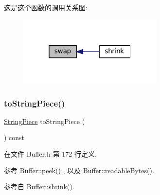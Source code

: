 这是这个函数的调用关系图\+:
\nopagebreak
\begin{figure}[H]
\begin{center}
\leavevmode
\includegraphics[width=205pt]{classmuduo_1_1net_1_1Buffer_a5a6560acf9880bf7a3b210c07bb3db2e_icgraph}
\end{center}
\end{figure}
\mbox{\label{classmuduo_1_1net_1_1Buffer_a78096dee3d0826efb63a5b814eef37c4}} 
\subsubsection{\texorpdfstring{to\+String\+Piece()}{toStringPiece()}}
{\footnotesize\ttfamily \hyperlink{classmuduo_1_1StringPiece}{String\+Piece} to\+String\+Piece (\begin{DoxyParamCaption}{ }\end{DoxyParamCaption}) const\hspace{0.3cm}{\ttfamily [inline]}}



在文件 Buffer.\+h 第 172 行定义.



参考 Buffer\+::peek() , 以及 Buffer\+::readable\+Bytes().



参考自 Buffer\+::shrink().

